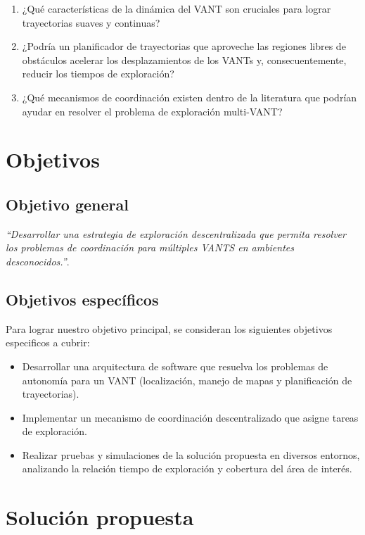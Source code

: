 \begin{enumerate}\setlength{\itemsep}{-1mm}
\item ¿Qué características de la dinámica del VANT son cruciales para lograr trayectorias suaves y continuas?
\item ¿Podría un planificador de trayectorias que aproveche las regiones libres de obstáculos acelerar los desplazamientos de los VANTs y, consecuentemente, reducir los tiempos de exploración?
\item ¿Qué mecanismos de coordinación existen dentro de la literatura que podrían ayudar en resolver el problema de exploración multi-VANT?
\end{enumerate}

\section{Objetivos}

\subsection*{Objetivo general}

\emph{``Desarrollar una estrategia de exploración descentralizada que permita resolver los problemas de coordinación para múltiples VANTS en ambientes desconocidos.''}.

\subsection*{Objetivos específicos}

Para lograr nuestro objetivo principal, se consideran los siguientes objetivos especificos a cubrir:

\begin{itemize}\setlength{\itemsep}{-1mm}
\item Desarrollar una arquitectura de software que resuelva los problemas de autonomía para un VANT (localización, manejo de mapas y planificación de trayectorias).
\item Implementar un mecanismo de coordinación descentralizado que asigne tareas de exploración.
\item Realizar pruebas y simulaciones de la solución propuesta en diversos entornos, analizando la relación tiempo de exploración y cobertura del área de interés.
\end{itemize}

\section{Solución propuesta}

